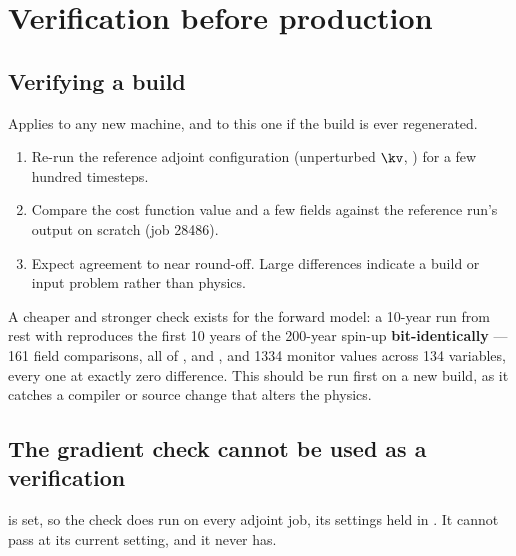 \section{Verification before production}

\subsection{Verifying a build}
\label{app:verify}

Applies to any new machine, and to this one if the build is ever regenerated.

\begin{enumerate}[nosep]
  \item Re-run the reference adjoint configuration (unperturbed $\kv$,
        ) for a few hundred timesteps.
  \item Compare the cost function value and a few  fields against the
        reference run's output on scratch (job 28486).
  \item Expect agreement to near round-off. Large differences indicate a build or
        input problem rather than physics.
\end{enumerate}

A cheaper and stronger check exists for the forward model: a 10-year run from
rest with  reproduces the first 10 years of the 200-year
spin-up \textbf{bit-identically} --- 161  field comparisons, all of
,  and , and 1334 monitor values
across 134 variables, every one at exactly zero difference. This should be run
first on a new build, as it catches a compiler or source change that alters the
physics.

\subsection{The gradient check cannot be used as a verification}
\label{app:grdchk}

 is set, so the check does run on every adjoint job,
its settings held in . It cannot pass at its
current setting, and it never has.

